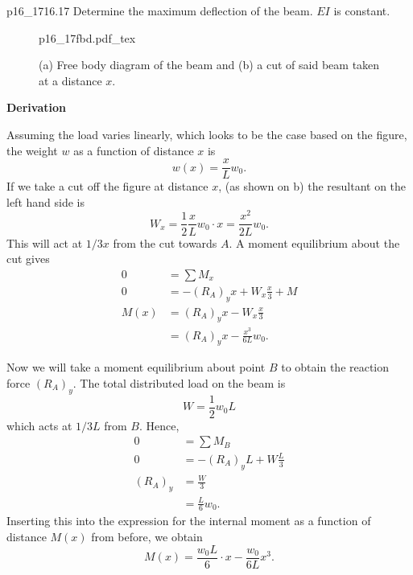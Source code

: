 \documentclass[a4paper]{article}
\newcommand{\incfig}[2][1]{%
  \def\svgwidth{#1\columnwidth}
  {#2.pdf_tex}
}
\newcounter{problem}
\numberwithin{equation}{problem}
\newcommand{\AUheading}[1]{%
  \par\vspace{.4\baselineskip}%
  {\sffamily\bfseries\color{AUblueDark}#1\par}%
  \nobreak%
}
\newenvironment{derivation}[1][Derivation]{%
  \AUheading{#1}
  \begingroup\allowdisplaybreaks
  \setlength{\abovedisplayskip}{6pt}%
  \setlength{\belowdisplayskip}{6pt}%
  \setlength{\abovedisplayshortskip}{4pt}%
  \setlength{\belowdisplayshortskip}{4pt}%
}{\par\endgroup\medskip}
\begin{document}


\begin{problemwithimage}[0.33\linewidth]{p16_17}{16.17}\label{pro:16-17}
  Determine the maximum deflection of the beam.
  $EI$ is constant.
\end{problemwithimage}

\begin{figure}[ht]
    \centering
    \incfig[0.9]{p16_17fbd}
    \caption{(a) Free body diagram of the beam and (b) a cut of said beam taken at a distance $x$.}
    \label{fig:p16_17fbd}
\end{figure}

\begin{derivation}
  Assuming the load varies linearly, which looks to be the case based on the figure, the weight $w$ as a function of distance $x$ is
  \begin{equation*}
    w(x) = \frac{x}{L} w_0
  .\end{equation*}
  If we take a cut off the figure at distance $x$, (as shown on b) the resultant on the left hand side is
  \begin{equation*}
    W_x = \frac{1}{2} \frac{x}{L} w_0 \cdot x = \frac{x^2}{2 L} w_0
  .\end{equation*}
  This will act at $1 / 3 x$ from the cut towards $A$.
  A moment equilibrium about the cut gives
  \begin{align*}
    0 &= \sum M_x \\
    0 &= - \left( R_A \right)_y x + W_x \frac{x}{3} + M \\
    M(x) &= \left( R_A \right)_y x - W_x \frac{x}{3} \\
         &= \left( R_A \right)_y x - \frac{x^3}{6L} w_0
  .\end{align*}

  Now we will take a moment equilibrium about point $B$ to obtain the reaction force $\left( R_A \right)_y$.
  The total distributed load on the beam is
  \begin{equation*}
    W = \frac{1}{2} w_0 L
  \end{equation*}
  which acts at $1 / 3 L$ from $B$.
  Hence,
  \begin{align*}
    0 &= \sum M_B \\
    0 &= - \left( R_A \right)_y L + W \frac{L}{3} \\
    \left( R_A \right)_y &= \frac{W}{3} \\
      &= \frac{L}{6} w_0
  .\end{align*}
  Inserting this into the expression for the internal moment as a function of distance $M(x)$ from before, we obtain
  \begin{equation*}
    M(x) = \frac{w_0 L}{6} \cdot x - \frac{w_0}{6 L} x^3
  .\end{equation*}
  

\end{derivation}
\end{document}
